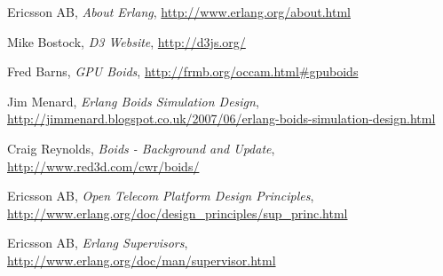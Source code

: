 \documentclass[10pt, a4paper, conference, compsocconf]{IEEEtran}
\begin{document}
%
%
%
\begin{thebibliography}{1}


    Ericsson AB,
    \emph{About Erlang},
    \url{http://www.erlang.org/about.html}

    Mike Bostock,
    \emph{D3 Website},
    \url{http://d3js.org/}

    Fred Barns,
    \emph{GPU Boids},
    \url{http://frmb.org/occam.html#gpuboids}

    Jim Menard,
    \emph{Erlang Boids Simulation Design},
    \url{http://jimmenard.blogspot.co.uk/2007/06/erlang-boids-simulation-design.html}

    Craig Reynolds,
    \emph{Boids - Background and Update},
    \url{http://www.red3d.com/cwr/boids/}

    Ericsson AB,
	\emph{Open Telecom Platform Design Principles},
    \url{http://www.erlang.org/doc/design_principles/sup_princ.html}

    Ericsson AB,
	\emph{Erlang Supervisors},
    \url{http://www.erlang.org/doc/man/supervisor.html}

\end{thebibliography}

\end{document}
